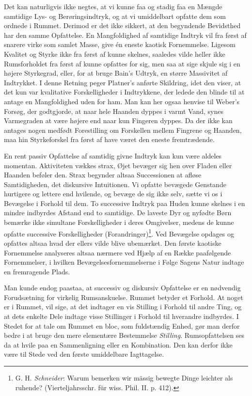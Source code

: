 \documentclass[12pt,a4paper,openany]{book}
\newcommand{\opage}[1]{\marginnote{\footnotesize\textit{[#1]}}}
\begin{document}
Det kan naturligvis ikke negtes, at vi kunne faa og stadig faa en Mængde
samtidige Lys- og Berøringsindtryk, og at vi umiddelbart opfatte dem som
ordnede i Rummet. Derimod er det ikke sikkert, at den begyndende
Bevidsthed har den samme Opfattelse. En Mangfoldighed af samtidige
Indtryk vil fra først af snarere virke som samlet Masse, give én eneste
kaotisk
\opage{244}Fornemmelse. Ligesom Kvalitet og Styrke ikke fra først af
kunne skelnes, saaledes vilde heller ikke Rumsforholdet fra først af
kunne opfattes for sig, men saa at sige skjule sig i en højere
Styrkegrad, eller, for at bruge Bain’s Udtryk, en større Massivitet af
Indtrykket. I denne Retning peger Platner’s anførte Skildring, idet den
viser, at det kun var kvalitative Forskelligheder i Indtrykkene, der
ledede den blinde til at antage en Mangfoldighed uden for ham. Man kan
her ogsaa henvise til Weber’s Forsøg, der godtgjorde, at naar hele
Haanden dyppes i varmt Vand, synes Varmegraden at være højere end naar
kun Fingeren dyppes. Da der ikke kan antages nogen medfødt Forestilling
om Forskellen mellem Fingrene og Haanden, maa hin Styrkeforskel fra
først af have været den eneste fremtrædende.

En rent passiv Opfattelse af samtidig givne Indtryk kan kun være aldeles
momentan. Aktiviteten vækkes strax, Øjet bevæger sig hen over Fladen
eller Haanden beføler den. Strax begynder altsaa Successionen at afløse
Samtidigheden, det diskursive Intuitionen. Vi opfatte bevægede Genstande
hurtigere og lettere end hvilende, og bevæge de sig ikke selv, sætte vi
os i Bevægelse i Forhold til dem. To successive Indtryk paa Huden kunne
skelnes i en mindre indbyrdes Afstand end to samtidige. De laveste Dyr
og nyfødte Børn bemærke ikke simultane Forskelligheder i deres
Omgivelser, medens de kunne opfatte successive Forskelligheder
(Forandringer)\footnote[1]{G. H. \emph{Schneider}: Warum bemerken wir
mässig bewegte Dinge leichter als ruhende? (Vierteljahrsschr. für wiss.
Phil. II. p. 412).}. Ved Bevægelse opdages og opfattes altsaa hvad der
ellers vilde blive ubemærket. Den første kaotiske Fornemmelse analyseres
altsaa nærmere ved Hjælp af en Række paafølgende Fornemmelser, i hvilken
Bevægelsesfornemmelserne i Følge Sagens Natur indtage en fremragende
Plads.

Man kunde endog paastaa, at successiv og diskursiv Opfattelse er en
nødvendig Forudsætning for virkelig Rumsanskuelse. Rummet betyder et
Forhold. At noget er i Rummet, vil sige, at det indtager en vis Stilling
i Forhold til andre Ting, og at dets enkelte Dele indtage visse
Stillinger i
\opage{245}Forhold til hverandre indbyrdes. I Stedet for at tale om
Rummet en bloc, som fuldstændig Enhed, gør man derfor bedre i at bruge
den mere elementære Bestemmelse \emph{Stilling}. Rumsopfattelsen ses da
at hvile paa en Sammenligning eller en Kombination. Den kan derfor ikke
være til Stede ved den første umiddelbare Iagttagelse.
\end{document}
